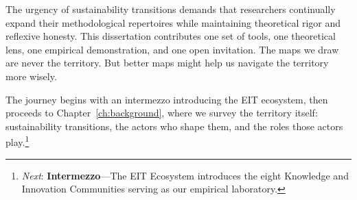 \documentclass[../main.tex]{subfiles}
\begin{document}
The urgency of sustainability transitions demands that researchers continually expand their methodological repertoires while maintaining theoretical rigor and reflexive honesty. This dissertation contributes one set of tools, one theoretical lens, one empirical demonstration, and one open invitation. The maps we draw are never the territory. But better maps might help us navigate the territory more wisely.

The journey begins with an intermezzo introducing the EIT ecosystem, then proceeds to Chapter~\ref{ch:background}, where we survey the territory itself: sustainability transitions, the actors who shape them, and the roles those actors play.\footnote{\textit{Next}: \textbf{Intermezzo}---The EIT Ecosystem introduces the eight Knowledge and Innovation Communities serving as our empirical laboratory.}

\clearpage
\end{document}

